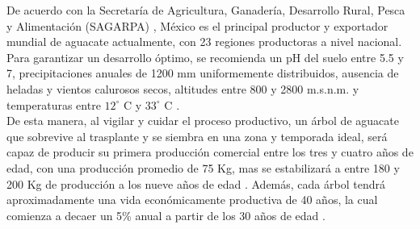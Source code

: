 De acuerdo con la Secretaría de Agricultura, Ganadería, Desarrollo Rural, Pesca y Alimentación (SAGARPA) \cite{SAGARPA_2017}, México es el principal productor y exportador mundial de aguacate actualmente, con 23 regiones productoras a nivel nacional. Para garantizar un desarrollo óptimo, se recomienda un pH del suelo entre 5.5 y 7, precipitaciones anuales de 1200 mm uniformemente distribuidos, ausencia de heladas y vientos calurosos secos, altitudes entre 800 y 2800 m.s.n.m. y temperaturas entre $12^\circ$ C y $33^\circ$ C \cite{CODESIN_2021}.\\


De esta manera, al vigilar y cuidar el proceso productivo, un árbol de aguacate que sobrevive al trasplante y se siembra en una zona y temporada ideal, será capaz de producir su primera producción comercial entre los tres y cuatro años de edad, con una producción promedio de 75 Kg, mas se estabilizará a entre 180 y 200 Kg de producción a los nueve años de edad \cite{Pena-Urquiza_2015}. Además, cada árbol tendrá aproximadamente una vida económicamente productiva de 40 años, la cual comienza a decaer un 5\% anual a partir de los 30 años de edad \cite{Mosquera_2015}.